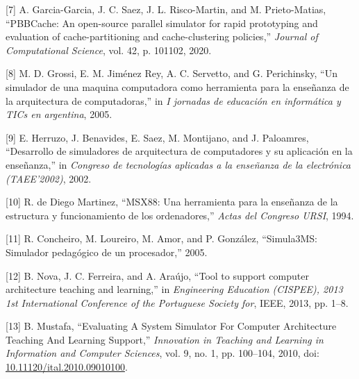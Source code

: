\documentclass[12pt,oneside]{templates/unerthesis}
\newcommand{\CSLLeftMargin}[1]{#1} %
\newcommand{\CSLRightInline}[1]{#1} %
\newlength{\cslhangindent}
\newenvironment{CSLReferences}[2] %
 {\setlength{\parindent}{0pt}%
  \setlength{\leftskip}{#1 pt\relax}%
  \setlength{\parskip}{#2 pt\relax}%
  \everypar{\setlength{\hangindent}{\cslhangindent}}}
 {\par}
\begin{document}
\begin{CSLReferences}{0}{0}
\leavevmode{}%
\CSLLeftMargin{{[}7{]} }%
\CSLRightInline{A. Garcia-Garcia, J. C. Saez, J. L. Risco-Martin, and M. Prieto-Matias, {``{PBBCache}: {An} open-source parallel simulator for rapid prototyping and evaluation of cache-partitioning and cache-clustering policies,''} \emph{Journal of Computational Science}, vol. 42, p. 101102, 2020.}

\leavevmode{}%
\CSLLeftMargin{{[}8{]} }%
\CSLRightInline{M. D. Grossi, E. M. Jiménez Rey, A. C. Servetto, and G. Perichinsky, {``Un simulador de una maquina computadora como herramienta para la enseñanza de la arquitectura de computadoras,''} in \emph{I jornadas de educación en informática y TICs en argentina}, 2005.}

\leavevmode{}%
\CSLLeftMargin{{[}9{]} }%
\CSLRightInline{E. Herruzo, J. Benavides, E. Saez, M. Montijano, and J. Paloamres, {``Desarrollo de simuladores de arquitectura de computadores y su aplicación en la enseñanza,''} in \emph{Congreso de tecnologías aplicadas a la enseñanza de la electrónica (TAEE'2002)}, 2002.}

\leavevmode{}%
\CSLLeftMargin{{[}10{]} }%
\CSLRightInline{R. de Diego Martinez, {``MSX88: Una herramienta para la enseñanza de la estructura y funcionamiento de los ordenadores,''} \emph{Actas del Congreso URSI}, 1994.}

\leavevmode{}%
\CSLLeftMargin{{[}11{]} }%
\CSLRightInline{R. Concheiro, M. Loureiro, M. Amor, and P. González, {``Simula3MS: Simulador pedagógico de un procesador,''} 2005.}

\leavevmode{}%
\CSLLeftMargin{{[}12{]} }%
\CSLRightInline{B. Nova, J. C. Ferreira, and A. Araújo, {``Tool to support computer architecture teaching and learning,''} in \emph{Engineering {Education} ({CISPEE}), 2013 1st {International} {Conference} of the {Portuguese} {Society} for}, IEEE, 2013, pp. 1--8.}

\leavevmode{}%
\CSLLeftMargin{{[}13{]} }%
\CSLRightInline{B. Mustafa, {``Evaluating {A} {System} {Simulator} {For} {Computer} {Architecture} {Teaching} {And} {Learning} {Support},''} \emph{Innovation in Teaching and Learning in Information and Computer Sciences}, vol. 9, no. 1, pp. 100--104, 2010, doi: \href{https://doi.org/10.11120/ital.2010.09010100}{10.11120/ital.2010.09010100}.}


\end{CSLReferences}
\end{document}
